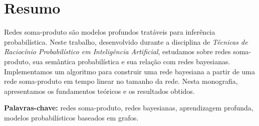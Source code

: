 \chapter*{Resumo}

\noindent Redes soma-produto são modelos profundos tratáveis para inferência probabilística. Neste trabalho, desenvolvido durante a disciplina de \emph{Técnicas de Raciocínio Probabilístico em Inteligência Artificial}, estudamos sobre redes soma-produto, sua semântica probabilística e sua relação com redes bayesianas. Implementamos um algoritmo para construir uma rede bayesiana a partir de uma rede soma-produto em tempo linear no tamanho da rede. Nesta monografia, apresentamos os fundamentos teóricos e os resultados obtidos.

\vspace{1em}

\noindent \textbf{Palavras-chave:} redes soma-produto, redes bayesianas, aprendizagem profunda, modelos probabilísticos baseados em grafos.

